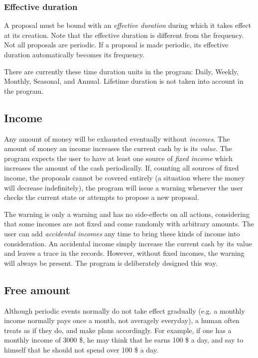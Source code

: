 \subsubsection{Effective duration}
A proposal must be bound with an \emph{effective duration} during which it takes effect at its creation. Note that the effective duration is different from the frequency. Not all proposals are periodic. If a proposal is made periodic, its effective duration automatically becomes its frequency.

There are currently these time duration units in the program: Daily, Weekly, Monthly, Seasonal, and Annual. Lifetime duration is not taken into account in the program.

\subsection{Income}
Any amount of money will be exhausted eventually without \emph{incomes}. The amount of money an income increases the current cash by is its \emph{value}. The program expects the user to have at least one source of \emph{fixed income} which increases the amount of the cash periodically. If, counting all sources of fixed income, the proposals cannot be covered entirely (a situation where the money will decrease indefinitely), the program will issue a warning whenever the user checks the current state or attempts to propose a new proposal.

The warning is only a warning and has no side-effects on all actions, considering that some incomes are not fixed and come randomly with arbitrary amounts. The user can add \emph{accidental incomes} any time to bring these kinds of income into consideration. An accidental income simply increase the current cash by its value and leaves a trace in the records. However, without fixed incomes, the warning will always be present. The program is deliberately designed this way.

\subsection{Free amount}
Although periodic events normally do not take effect gradually (e.g. a monthly income normally pays once a month, not averagely everyday), a human often treats as if they do, and make plans accordingly. For example, if one has a monthly income of 3000 \$, he may think that he earns 100 \$ a day, and say to himself that he should not spend over 100 \$ a day.

